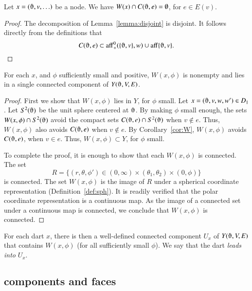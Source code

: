\begin{corollary}  
Let $x = (\orgn,v,\ldots)$ be a node.
We have $W(x)\cap C(\orgn,e)=\emptyset$, for $e\in E(v)$.
\end{corollary}

\begin{proof} The decomposition of Lemma~\ref{lemma:disjoint} is
disjoint.  It follows directly from the definitions that
   $$C(\orgn,e)\subset \op{aff}_+^0(\{\orgn,v\},w) \cup 
    \op{aff}\{\orgn,v\}.$$
\end{proof}

\begin{lemma} For each $x$, and $\phi$ sufficiently small and positive,
$W(x,\phi)$ is nonempty and lies in a single connected
component of $Y(\orgn,V,E)$.
\end{lemma}

\begin{proof}  First we show that $W(x,\phi)$ lies in $Y$,
for $\phi$ small.  Let $x=(\orgn,v,w,w')\in D_1$.  
Let $S^2(\orgn)$ be the unit sphere centered at $\orgn$.
By making $\phi$ small enough,
the sets $W(x,\phi)\cap S^2(\orgn)$
avoid the compact sets $C(\orgn,e)\cap S^2(\orgn)$ when $v\not\in e$.
Thus, $W(x,\phi)$ also avoids $C(\orgn,e)$ when $v\not\in e$.
By Corollary~\ref{cor:W}, $W(x,\phi)$ avoids $C(\orgn,e)$, when $v\in e$.
Thus, $W(x,\phi)\subset Y$, for $\phi$ small.

To complete the proof, it is enough to show that each $W(x,\phi)$ is
connected.  
The  set
   $$
   R=\{(r,\theta,\phi') \in (0,\infty) \times (\theta_1,\theta_2) \times (0,\phi)\}
   $$
is connected.
The set $W(x,\phi)$  is the image of $R$
under a spherical coordinate representation (Definition~\ref{def:sph}).
It is readily verified that the polar coordinate representation is
a continuous map. As the image of a connected set under a continuous map
is connected, we conclude that $W(x,\phi)$ is connected.
\end{proof}

\begin{definition} For each dart $x$, 
there is then a well-defined connected
component $U_x$ of $Y(\orgn,V,E)$ 
that contains $W(x,\phi)$ (for all
sufficiently small $\phi$). We say that the dart {\it leads into}
$U_x$.
\end{definition}


\subsection{components and faces}

